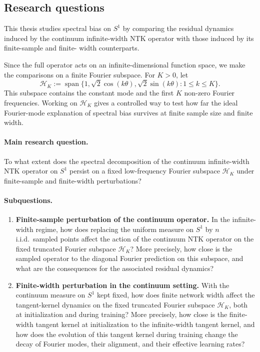 \begin{revblock}
	\section{Research questions}

	This thesis studies spectral bias on \(S^1\) by comparing the residual dynamics induced by the
	continuum infinite-width NTK operator with those induced by its finite-sample and finite-
	width counterparts.

	Since the full operator acts on an infinite-dimensional function space, we make
	the comparisons on a finite Fourier subspace. For \(K > 0\), let
	\[
		\mathcal H_K
		:=
		\operatorname{span}
		\{1,\sqrt{2}\cos(k\theta),\sqrt{2}\sin(k\theta):1\le k\le K\}.
	\]
	This subspace contains the constant mode and the first \(K\) non-zero Fourier
	frequencies. Working on \(\mathcal H_K\) gives a controlled way to test how far
	the ideal Fourier-mode explanation of spectral bias survives at finite sample
	size and finite width.
\end{revblock}

\paragraph{Main research question.}
To what extent does the spectral decomposition of the continuum infinite-width
NTK operator on \(S^1\) persist on a fixed low-frequency Fourier subspace
\(\mathcal H_K\) under finite-sample and finite-width perturbations?

\paragraph{Subquestions.}
\begin{enumerate}
	\item[(RQ1)] \textbf{Finite-sample perturbation of the continuum operator.}
	      In the infinite-width regime, how does replacing the uniform measure
	      on \(S^1\) by \(n\) i.i.d.\ sampled points affect the action of the
	      continuum NTK operator on the fixed truncated Fourier subspace
	      \(\mathcal H_K\)?
	      More precisely, how close is the sampled operator to the diagonal
	      Fourier prediction on this subspace, and what are the consequences
	      for the associated residual dynamics?
	\item[(RQ2)] \textbf{Finite-width perturbation in the continuum setting.}
	      With the continuum measure on \(S^1\) kept fixed, how does finite
	      network width affect the tangent-kernel dynamics on the fixed truncated
	      Fourier subspace \(\mathcal H_K\), both at initialization and during
	      training?
	      More precisely, how close is the finite-width tangent kernel at
	      initialization to the infinite-width tangent kernel, and how does
	      the evolution of this tangent kernel during training change the decay of Fourier
	      modes, their alignment, and their effective learning rates?
\end{enumerate}

